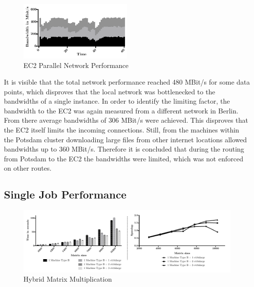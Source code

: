 \begin{figure}[!htb]
	\includegraphics[width=0.5\textwidth]{images/ec2_stacked_network_performance.pdf}
	\centering
	\caption{EC2 Parallel Network Performance}
	\label{img:EC2 Parallel Network Performance}
\end{figure}

It is visible that the total network performance reached 480 MBit/s for some data points, which disproves that the local network was bottlenecked to the bandwidths of a single instance. In order to identify the limiting factor, the bandwidth to the EC2 was again measured from a different network in Berlin. From there average bandwidths of 306 MBit/s were achieved. This disproves that the EC2 itself limits the incoming connections. Still, from the machines within the Potsdam cluster downloading large files from other internet locations allowed bandwidths up to 360 MBit/s. Therefore it is concluded that during the routing from Potsdam to the EC2 the bandwidths were limited, which was not enforced on other routes.

\subsection*{Single Job Performance}

\begin{figure}[!htb]
	\includegraphics[width=1.0\textwidth]{images/hybrid_matrix_multiplication.pdf}
	\centering
	\caption{Hybrid Matrix Multiplication}
	\label{img:hybrid_matrix_multiplication}
\end{figure}

